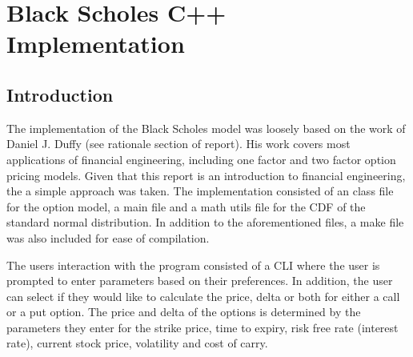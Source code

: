 \documentclass[12pt]{article}
\begin{document}
\section{Black Scholes C++ Implementation}
\subsection{Introduction}
The implementation of the Black Scholes model was loosely based on the work of Daniel J. Duffy (see rationale section of report). His work covers most applications of financial engineering, including one factor and two factor option pricing models. Given that this report is an introduction to financial engineering, the a simple approach was taken. The implementation consisted of an class file for the option model, a main file and a math utils file for the CDF of the standard normal distribution. In addition to the aforementioned files, a make file was also included for ease of compilation.

The users interaction with the program consisted of a CLI where the user is prompted to enter parameters based on their preferences. In addition, the user can select if they would like to calculate the price, delta or both for either a call or a put option. The price and delta of the options is determined by the parameters they enter for the strike price, time to expiry, risk free rate (interest rate), current stock price, volatility and cost of carry.
\end{document}
